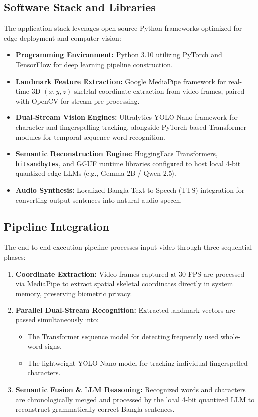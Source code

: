 \subsection{Software Stack and Libraries}
The application stack leverages open-source Python frameworks optimized for edge deployment and computer vision:
\begin{itemize}
\item \textbf{Programming Environment:} Python 3.10 utilizing PyTorch and TensorFlow for deep learning pipeline construction.
\item \textbf{Landmark Feature Extraction:} Google MediaPipe framework for real-time 3D $(x, y, z)$ skeletal coordinate extraction from video frames, paired with OpenCV for stream pre-processing.
\item \textbf{Dual-Stream Vision Engines:} Ultralytics YOLO-Nano framework for character and fingerspelling tracking, alongside PyTorch-based Transformer modules for temporal sequence word recognition.
\item \textbf{Semantic Reconstruction Engine:} HuggingFace Transformers, \texttt{bitsandbytes}, and GGUF runtime libraries configured to host local 4-bit quantized edge LLMs (e.g., Gemma 2B / Qwen 2.5).
\item \textbf{Audio Synthesis:} Localized Bangla Text-to-Speech (TTS) integration for converting output sentences into natural audio speech.
\end{itemize}

\subsection{Pipeline Integration}
The end-to-end execution pipeline processes input video through three sequential phases:
\begin{enumerate}
\item \textbf{Coordinate Extraction:} Video frames captured at 30 FPS are processed via MediaPipe to extract spatial skeletal coordinates directly in system memory, preserving biometric privacy.
\item \textbf{Parallel Dual-Stream Recognition:} Extracted landmark vectors are passed simultaneously into:
\begin{itemize}
\item The Transformer sequence model for detecting frequently used whole-word signs.
\item The lightweight YOLO-Nano model for tracking individual fingerspelled characters.
\end{itemize}
\item \textbf{Semantic Fusion & LLM Reasoning:} Recognized words and characters are chronologically merged and processed by the local 4-bit quantized LLM to reconstruct grammatically correct Bangla sentences.
\end{enumerate}

